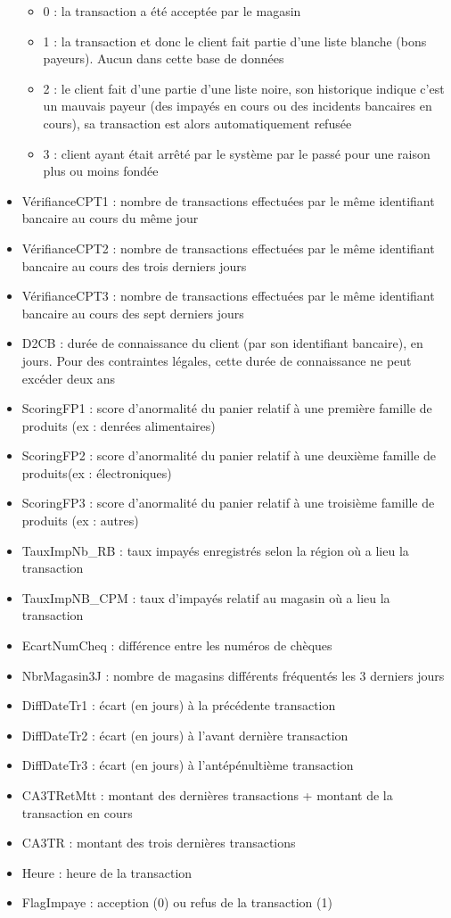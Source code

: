 \documentclass[11pt]{article}
\providecommand{\tightlist}{%
      \setlength{\itemsep}{0pt}\setlength{\parskip}{0pt}}
\begin{document}
\begin{itemize}
  \begin{itemize}
  \tightlist
  \item
    0 : la transaction a été acceptée par le magasin
  \item
    1 : la transaction et donc le client fait partie d'une liste blanche
    (bons payeurs). Aucun dans cette base de données
  \item
    2 : le client fait d'une partie d'une liste noire, son historique
    indique c'est un mauvais payeur (des impayés en cours ou des
    incidents bancaires en cours), sa transaction est alors
    automatiquement refusée
  \item
    3 : client ayant était arrêté par le système par le passé pour une
    raison plus ou moins fondée
  \end{itemize}
\item
  VérifianceCPT1 : nombre de transactions effectuées par le même
  identifiant bancaire au cours du même jour
\item
  VérifianceCPT2 : nombre de transactions effectuées par le même
  identifiant bancaire au cours des trois derniers jours
\item
  VérifianceCPT3 : nombre de transactions effectuées par le même
  identifiant bancaire au cours des sept derniers jours
\item
  D2CB : durée de connaissance du client (par son identifiant bancaire),
  en jours. Pour des contraintes légales, cette durée de connaissance ne
  peut excéder deux ans
\item
  ScoringFP1 : score d'anormalité du panier relatif à une première
  famille de produits (ex : denrées alimentaires)
\item
  ScoringFP2 : score d'anormalité du panier relatif à une deuxième
  famille de produits(ex : électroniques)
\item
  ScoringFP3 : score d'anormalité du panier relatif à une troisième
  famille de produits (ex : autres)
\item
  TauxImpNb\_RB : taux impayés enregistrés selon la région où a lieu la
  transaction
\item
  TauxImpNB\_CPM : taux d'impayés relatif au magasin où a lieu la
  transaction
\item
  EcartNumCheq : différence entre les numéros de chèques
\item
  NbrMagasin3J : nombre de magasins différents fréquentés les 3 derniers
  jours
\item
  DiffDateTr1 : écart (en jours) à la précédente transaction
\item
  DiffDateTr2 : écart (en jours) à l'avant dernière transaction
\item
  DiffDateTr3 : écart (en jours) à l'antépénultième transaction
\item
  CA3TRetMtt : montant des dernières transactions + montant de la
  transaction en cours
\item
  CA3TR : montant des trois dernières transactions
\item
  Heure : heure de la transaction
\item
  FlagImpaye : acception (0) ou refus de la transaction (1)
\end{itemize}
\end{document}
